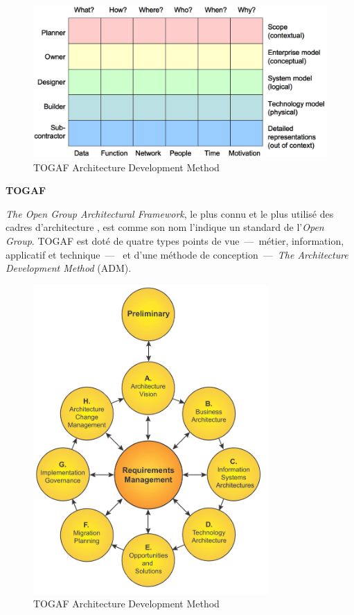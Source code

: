 \begin{figure}[!htbp]
 \begin{center}
  \includegraphics[width=1\textwidth]{images/Chapitre1/zachman.png}
 \end{center}
 \caption{TOGAF Architecture Development Method  \protect\cite{zachman1987framework}}
 \label{fig:Zachman}
\end{figure}

\textbf{TOGAF} 

\textit{The Open Group Architectural Framework}, le plus connu et le plus utilisé des cadres d'architecture \cite{winter2008enterprise}, est comme son nom l'indique un standard de l'\textit{Open Group}. TOGAF est doté de quatre types points de vue~—~métier, information, applicatif et technique~—~  et d'une méthode de conception~—~\textit{The Architecture Development Method} (ADM). 

\begin{figure}[!htbp]
 \begin{center}
  \includegraphics[width=0.8\textwidth]{images/Chapitre1/TOGAF9_Wheel.png}
 \end{center}
 \caption{TOGAF Architecture Development Method  \protect\cite{togaf2009}}
 \label{fig:TOGAF}
\end{figure}

